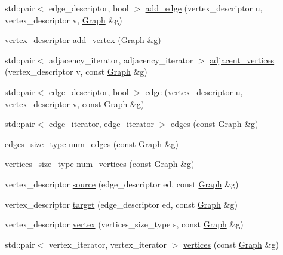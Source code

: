 \begin{DoxyCompactItemize}
\item 
std\-::pair$<$ edge\-\_\-descriptor, bool $>$ \hyperlink{classGraph_a21aaff00ca2ef2f86932f4f4803adbd9}{add\-\_\-edge} (vertex\-\_\-descriptor u, vertex\-\_\-descriptor v, \hyperlink{classGraph}{\-Graph} \&g)
\item 
vertex\-\_\-descriptor \hyperlink{classGraph_a460812cc36de1f018d533425648cd957}{add\-\_\-vertex} (\hyperlink{classGraph}{\-Graph} \&g)
\item 
std\-::pair$<$ adjacency\-\_\-iterator, \*
adjacency\-\_\-iterator $>$ \hyperlink{classGraph_a8b26e739f66119542aa05ebf22d95ccc}{adjacent\-\_\-vertices} (vertex\-\_\-descriptor v, const \hyperlink{classGraph}{\-Graph} \&g)
\item 
std\-::pair$<$ edge\-\_\-descriptor, bool $>$ \hyperlink{classGraph_ac71261875661196767a4727426720e87}{edge} (vertex\-\_\-descriptor u, vertex\-\_\-descriptor v, const \hyperlink{classGraph}{\-Graph} \&g)
\item 
std\-::pair$<$ edge\-\_\-iterator, \*
edge\-\_\-iterator $>$ \hyperlink{classGraph_a9d595e6a5ba50cc48612a97ebb08c423}{edges} (const \hyperlink{classGraph}{\-Graph} \&g)
\item 
edges\-\_\-size\-\_\-type \hyperlink{classGraph_a8762ff8f5b09fea3fdcfb92c2648336e}{num\-\_\-edges} (const \hyperlink{classGraph}{\-Graph} \&g)
\item 
vertices\-\_\-size\-\_\-type \hyperlink{classGraph_a58495c0a2630da064db06001bbee4b83}{num\-\_\-vertices} (const \hyperlink{classGraph}{\-Graph} \&g)
\item 
vertex\-\_\-descriptor \hyperlink{classGraph_abeea1d6e4e84c501f639fb547f46a732}{source} (edge\-\_\-descriptor ed, const \hyperlink{classGraph}{\-Graph} \&g)
\item 
vertex\-\_\-descriptor \hyperlink{classGraph_a5faf1143ace31bbc5e269a15a1b73829}{target} (edge\-\_\-descriptor ed, const \hyperlink{classGraph}{\-Graph} \&g)
\item 
vertex\-\_\-descriptor \hyperlink{classGraph_a1b93d793838c1570ad0914cc9a6befbc}{vertex} (vertices\-\_\-size\-\_\-type s, const \hyperlink{classGraph}{\-Graph} \&g)
\item 
std\-::pair$<$ vertex\-\_\-iterator, \*
vertex\-\_\-iterator $>$ \hyperlink{classGraph_a8af8c02507f2320f17008c3d7e7a471c}{vertices} (const \hyperlink{classGraph}{\-Graph} \&g)
\end{DoxyCompactItemize}


